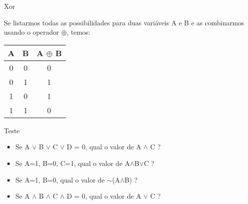 \begin{frame}{Xor} 

	Se listarmos todas as possibilidades para duas variáveis A e B e as combinarmos usando o operador $\oplus$, temos:
		\center 
		\begin{tabular}{|c|c|c|} \hline 
			\textbf{A} & \textbf{B} & \textbf{A $\oplus$ B} \\ \hline 
			0 & 0 & 0 \\ \hline 
			0 & 1 & 1 \\ \hline 
			1 & 0 & 1 \\ \hline 
			1 & 1 & 0 \\ \hline 
		\end{tabular} 

\end{frame}

\begin{frame}{Teste} 
	\begin{itemize}
		\item Se A $\vee$ B $\vee$ C $\vee$ D = 0, qual o valor de A $\wedge$ C ?
		\item Se A=1, B=0, C=1, qual o valor de A$\wedge$B$\vee$C ?
		\item Se A=1, B=0, qual o valor de $\sim$(A$\wedge$B) ?
		\item Se A $\wedge$ B $\wedge$ C $\wedge$ D = 0, qual o valor de A $\vee$ C ?
	\end{itemize}

\end{frame}







